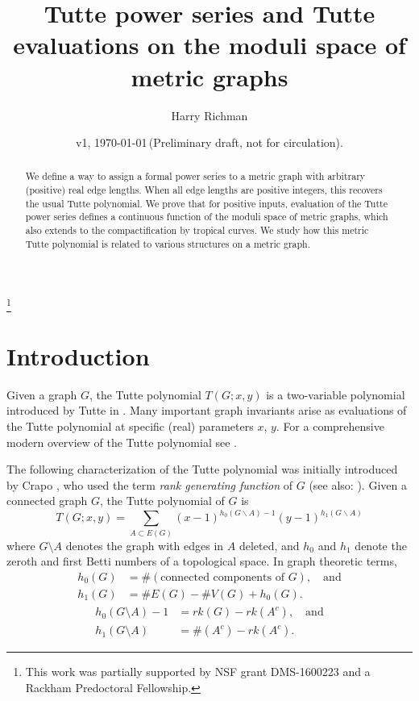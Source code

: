 \documentclass{amsart}
\theoremstyle{definition}
\begin{document}
\title[Tutte power series on metric graphs]{Tutte power series and Tutte evaluations on the moduli space of metric graphs}
\author{Harry Richman}
\date{v1, \today  \,(Preliminary draft, not for circulation).}
\thanks{This work was partially supported by NSF grant DMS-1600223
and a Rackham Predoctoral Fellowship.}


\begin{abstract}
We define a way to assign a formal power series to a metric graph with arbitrary
(positive) real edge lengths.
When all edge lengths are positive integers,
this recovers the usual Tutte polynomial.
We prove that for positive inputs, evaluation of the Tutte power series
defines a continuous function of the moduli space of metric graphs,
which also extends to the compactification by tropical curves.
We study how this metric Tutte polynomial is
related to various structures on a metric graph.
\end{abstract}
\maketitle


\section{Introduction}
Given a graph $G$,
the Tutte polynomial $T(G;x,y)$ 
is 
 a two-variable polynomial %
introduced by Tutte in \cite{Tut}.
Many important graph invariants arise as evaluations of 
the Tutte polynomial %
at specific (real) parameters $x$, $y$.
For a comprehensive modern overview of the Tutte polynomial see \cite{BO} \cite{EMM}.

The following characterization of the Tutte polynomial was initially introduced by Crapo \cite{Cra}, who used the term {\em rank generating function} of $G$
(see also: \cite[Definition 3]{EMM}).
Given a connected graph $G $, 
the Tutte polynomial of $G$ is 
\begin{equation}
\label{eq:tutte-graph}
T(G; x,y) = \sum_{A \subset E(G)} (x-1)^{h_0(G\backslash A) - 1}(y-1)^{h_1(G\backslash A)}
\end{equation}
where $G\setminus A$ denotes the graph with edges in $A$ deleted,
and $h_0$ and $h_1$ denote the zeroth and first Betti numbers of 
a topological space.
In graph theoretic terms,
\begin{align*}
h_0(G) &= \#(\text{connected components of }G), \quad\text{and}\\
h_1(G) &= \# E(G) - \# V(G) + h_0(G) .
\end{align*}
\begin{align*}
h_0(G\setminus A) - 1 &= rk(G) - rk(A^c), \quad\text{and}\\
h_1(G\setminus A) &= \#(A^c) - rk(A^c) .
\end{align*}
\end{document}
